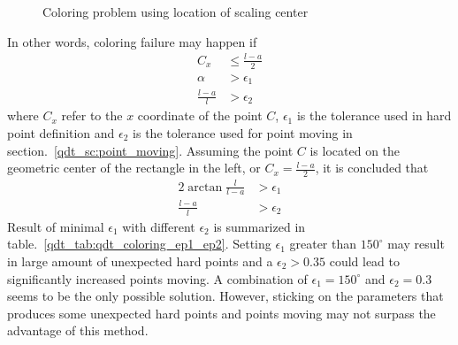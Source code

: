     \begin{figure}[h!]
        \centering
        \caption[Coloring problem using location of scaling center]{Coloring problem using location of scaling center}
        \label{qdt_fig:qdt_coloring_geo_problem_sc}
    \end{figure}
%
In other words, coloring failure may happen if
    \begin{equation}
        \begin{aligned}
            C_x  &\leq \frac{l-a}{2} \\
            \alpha &> \epsilon_{1} \\
            \frac{l-a}{l} &> \epsilon_{2}
        \end{aligned}
    \end{equation}
where $C_x$ refer to the $x$ coordinate of the point $C$, $\epsilon_1$ is the tolerance used in hard point definition and $\epsilon_2$ is the tolerance used for point moving in section.~\ref{qdt_sc:point_moving}.
Assuming the point $C$ is located on the geometric center of the rectangle in the left, or $C_x = \frac{l-a}{2}$, it is concluded that 
    \begin{equation}
        \begin{aligned}
            2 \arctan \frac{l}{l-a} &> \epsilon_1 \\
            \frac{l-a}{l} &> \epsilon_{2}
        \end{aligned}
    \end{equation}
%
Result of minimal $\epsilon_1$ with different $\epsilon_2$ is summarized in table.~\ref{qdt_tab:qdt_coloring_ep1_ep2}.
Setting $\epsilon_1$ greater than $150^\circ$ may result in large amount of unexpected hard points and a $\epsilon_2 > 0.35$ could lead to significantly increased points moving.
A combination of $\epsilon_1 = 150^\circ$ and $\epsilon_2 = 0.3$ seems to be the only possible solution.
However, sticking on the parameters that produces some unexpected hard points and points moving may not surpass the advantage of this method.

